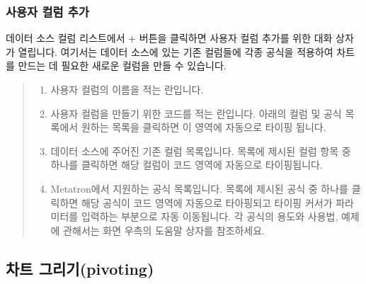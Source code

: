 \documentclass[letterpaper,10pt,english]{sphinxmanual}
\begin{document}
\subsubsection{사용자 컬럼 추가}
\label{\detokenize{discovery/part04/composition_of_the_data_column_list:id3}}
데이터 소스 컬럼 리스트에서 + 버튼을 클릭하면 사용자 컬럼 추가를 위한 대화 상자가 열립니다. 여기서는 데이터 소스에 있는 기존 컬럼들에 각종 공식을 적용하여 차트를 만드는 데 필요한 새로운 컬럼을 만들 수 있습니다.
\begin{quote}

\begin{figure}[H]
\centering

\noindent{}
\end{figure}
\begin{enumerate}
\def\theenumi{\arabic{enumi}}
\def\labelenumi{\theenumi .}
\makeatletter\def\p@enumii{\p@enumi \theenumi .}\makeatother
\item {} 
 사용자 컬럼의 이름을 적는 란입니다.

\item {} 
 사용자 컬럼을 만들기 위한 코드를 적는 란입니다. 아래의 컬럼 및 공식 목록에서 원하는 목록을 클릭하면 이 영역에 자동으로 타이핑 됩니다.

\item {} 
 데이터 소스에 주어진 기존 컬럼 목록입니다. 목록에 제시된 컬럼 항목 중 하나를 클릭하면 해당 컬럼이 코드 영역에 자동으로 타이핑됩니다.

\item {} 
 Metatron에서 지원하는 공식 목록입니다. 목록에 제시된 공식 중 하나를 클릭하면 해당 공식이 코드 영역에 자동으로 타아핑되고 타이핑 커서가 파라미터를 입력하는 부분으로 자동 이동됩니다. 각 공식의 용도와 사용법, 예제에 관해서는 화면 우측의 도움말 상자를 참조하세요.

\end{enumerate}
\end{quote}


\subsection{차트 그리기(pivoting)}
\label{\detokenize{discovery/part04/pivoting:pivoting}}\label{\detokenize{discovery/part04/pivoting::doc}}
\end{document}

